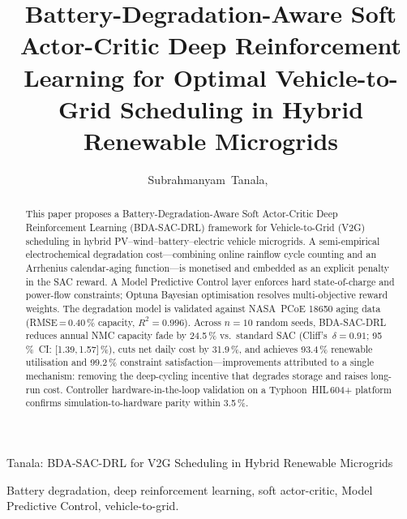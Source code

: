 \documentclass[journal,10pt,twocolumn]{IEEEtran}
\begin{document}
\title{Battery-Degradation-Aware Soft Actor-Critic Deep Reinforcement
       Learning for Optimal Vehicle-to-Grid Scheduling in Hybrid
       Renewable Microgrids}

\author{Subrahmanyam~Tanala,~}

%
{Tanala: BDA-SAC-DRL for V2G Scheduling in Hybrid Renewable Microgrids}

\maketitle

\begin{abstract}
This paper proposes a Battery-Degradation-Aware Soft Actor-Critic Deep
Reinforcement Learning (BDA-SAC-DRL) framework for Vehicle-to-Grid (V2G)
scheduling in hybrid PV--wind--battery--electric vehicle microgrids.
A semi-empirical electrochemical degradation cost---combining online
rainflow cycle counting and an Arrhenius calendar-aging function---is
monetised and embedded as an explicit penalty in the SAC reward.
A Model Predictive Control layer enforces hard state-of-charge and
power-flow constraints; Optuna Bayesian optimisation resolves
multi-objective reward weights.
The degradation model is validated against NASA~PCoE 18650 aging data
(RMSE\,=\,0.40\,\% capacity, $R^2=0.996$).
Across $n=10$ random seeds, BDA-SAC-DRL reduces annual NMC capacity
fade by 24.5\,\% vs.\ standard SAC (Cliff's~$\delta=0.91$;
95\,\%~CI: [1.39,\,1.57]\,\%), cuts net daily cost by 31.9\,\%, and
achieves 93.4\,\% renewable utilisation and 99.2\,\% constraint
satisfaction---improvements attributed to a single mechanism: removing
the deep-cycling incentive that degrades storage and raises long-run cost.
Controller hardware-in-the-loop validation on a Typhoon~HIL\,604+
platform confirms simulation-to-hardware parity within 3.5\,\%.
\end{abstract}

\begin{IEEEkeywords}
Battery degradation, deep reinforcement learning, soft actor-critic,
Model Predictive Control, vehicle-to-grid.
\end{IEEEkeywords}
\end{document}

